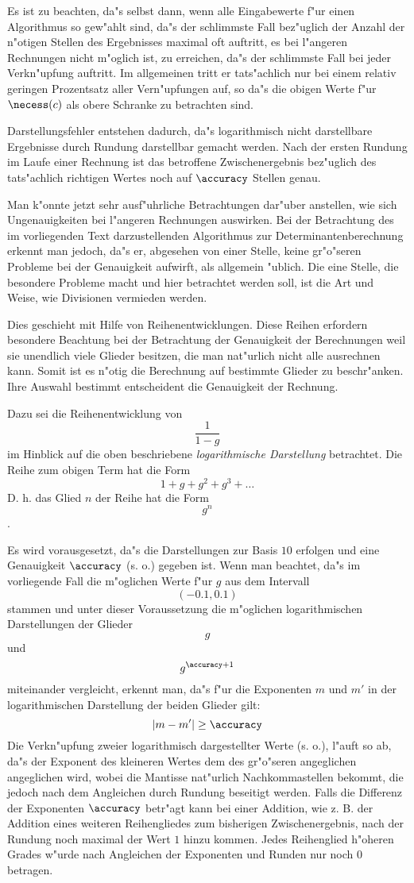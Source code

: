 Es ist zu beachten, da"s selbst dann, wenn alle Eingabewerte f"ur einen
Algorithmus so gew"ahlt sind, da"s der schlimmste Fall bez"uglich der Anzahl
der n"otigen Stellen des Ergebnisses maximal oft auftritt, es bei l"angeren
Rechnungen nicht m"oglich ist, zu erreichen, da"s der schlimmste Fall bei
jeder Verkn"upfung auftritt. Im allgemeinen tritt er tats"achlich nur bei
einem relativ geringen Prozentsatz aller Vern"upfungen auf, so da"s die 
obigen Werte f"ur $\necess(c)$ als obere Schranke zu betrachten sind.

Darstellungsfehler entstehen dadurch, da"s
logarithmisch nicht darstellbare Ergebnisse durch Rundung darstellbar
gemacht werden. Nach der ersten Rundung im Laufe einer Rechnung ist das
betroffene Zwischenergebnis bez"uglich des tats"achlich richtigen Wertes
noch auf $\accuracy$ Stellen genau.

Man k"onnte jetzt sehr ausf"uhrliche
Betrachtungen dar"uber anstellen, wie sich Ungenauigkeiten bei l"angeren
Rechnungen auswirken. Bei der Betrachtung des im vorliegenden Text
darzustellenden Algorithmus zur Determinantenberechnung erkennt man jedoch,
da"s er, abgesehen von einer Stelle, keine gr"o"seren Probleme bei der
Genauigkeit aufwirft, als allgemein "ublich. Die eine Stelle, die
besondere Probleme macht und hier betrachtet werden soll, ist die Art
und Weise, wie Divisionen vermieden werden.

Dies geschieht mit Hilfe von Reihenentwicklungen. Diese
Reihen erfordern besondere Beachtung bei der Betrachtung der Genauigkeit
der Berechnungen weil sie
unendlich viele Glieder besitzen, die man nat"urlich nicht alle
ausrechnen kann. Somit ist es n"otig die Berechnung auf bestimmte Glieder zu
beschr"anken. Ihre Auswahl bestimmt entscheident die Genauigkeit der
Rechnung.

Dazu sei die Reihenentwicklung von \[ \frac{1}{1-g} \] im Hinblick auf die
oben beschriebene {\em logarithmische Darstellung} betrachtet. Die
Reihe zum obigen Term hat die Form \[ 1 + g + g^2 + g^3 + \ldots \] D. h.
das Glied $n$ der Reihe hat die Form \[ g^n \].

Es wird vorausgesetzt, da"s die Darstellungen zur Basis $10$ erfolgen und
eine Genauigkeit $\accuracy$ (s. o.) gegeben ist.
Wenn man beachtet, da"s im vorliegende Fall die m"oglichen Werte f"ur $g$
aus dem Intervall \[ (-0.1,0.1) \] stammen und unter dieser Voraussetzung
die m"oglichen logarithmischen Darstellungen der Glieder \[ g \] und 
\[ g^{\accuracy+1} \] miteinander vergleicht, erkennt man, da"s f"ur 
die Exponenten $m$ und $m'$ in der logarithmischen Darstellung der beiden 
Glieder gilt: \[ |m-m'| \geq \accuracy \]
Die Verkn"upfung zweier logarithmisch dargestellter Werte (s. o.), 
l"auft so ab,
da"s der Exponent des kleineren Wertes dem des gr"o"seren angeglichen
angeglichen wird, wobei die Mantisse nat"urlich Nachkommastellen bekommt,
die jedoch nach dem Angleichen durch Rundung beseitigt werden. Falls die
Differenz der Exponenten $\accuracy$ betr"agt kann bei einer Addition, wie
z. B. der Addition eines weiteren Reihengliedes zum bisherigen 
Zwischenergebnis, nach der Rundung noch maximal der Wert $1$ hinzu kommen.
Jedes Reihenglied h"oheren Grades w"urde nach Angleichen der Exponenten 
und Runden nur noch $0$ betragen.

